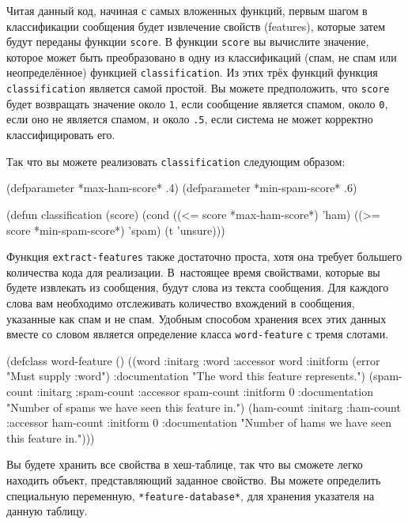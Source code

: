 Читая данный код, начиная с самых вложенных функций, первым шагом в классификации сообщения
будет извлечение свойств (features), которые затем будут переданы функции \lstinline{score}.  В
функции \lstinline{score} вы вычислите значение, которое может быть преобразовано в одну из
классификаций (спам, не спам или неопределённое) функцией \lstinline{classification}.  Из этих
трёх функций функция \lstinline{classification} является самой простой. Вы можете
предположить, что \lstinline{score} будет возвращать значение около \lstinline{1}, если сообщение
является спамом, около \lstinline{0}, если оно не является спамом, и около \lstinline{.5}, если
система не может корректно классифицировать его.

Так что вы можете реализовать \lstinline{classification} следующим образом:

\begin{myverb}
(defparameter *max-ham-score* .4)
(defparameter *min-spam-score* .6)

(defun classification (score)
  (cond
    ((<= score *max-ham-score*) 'ham)
    ((>= score *min-spam-score*) 'spam)
    (t 'unsure)))
\end{myverb}

Функция \lstinline{extract-features} также достаточно проста, хотя она требует большего
количества кода для реализации.  В~настоящее время свойствами, которые вы будете
извлекать из сообщения, будут слова из текста сообщения.  Для каждого слова вам необходимо
отслеживать количество вхождений в сообщения, указанные как спам и не спам.  Удобным
способом хранения всех этих данных вместе со словом является определение класса
\lstinline{word-feature} с тремя слотами.

\begin{myverb}
(defclass word-feature ()
  ((word       
    :initarg :word
    :accessor word
    :initform (error "Must supply :word")
    :documentation "The word this feature represents.")
   (spam-count
    :initarg :spam-count
    :accessor spam-count
    :initform 0
    :documentation "Number of spams we have seen this feature in.")
   (ham-count
    :initarg :ham-count
    :accessor ham-count
    :initform 0
    :documentation "Number of hams we have seen this feature in.")))
\end{myverb}

Вы будете хранить все свойства в хеш-таблице, так что вы сможете легко находить объект,
представляющий заданное свойство.  Вы можете определить специальную переменную,
\lstinline{*feature-database*}, для хранения указателя на данную таблицу.

